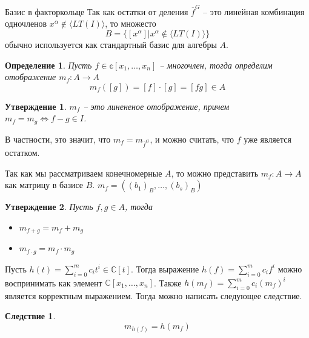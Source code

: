 \documentclass[notheorems,aspectratio=169]{beamer}
\newtheorem{definition}{Определение}
\newtheorem{statement}{Утверждение}
\newtheorem{corollary}{Следствие}
\begin{document}
\begin{frame}{Базис в факторкольце}
    Так как остатки от деления $\overline f^G$ -- это линейная комбинация одночленов $x^\alpha \not\in \langle LT(I) \rangle$, то множесто 
    $$
        B = \{[x^\alpha] | x^\alpha \not\in \langle LT(I) \rangle \}
    $$ 
    обычно используется как стандартный базис для алгебры $A$.
\end{frame}

\begin{frame}{}
    \begin{definition}
        Пусть $f\in\mathbb{c}[x_1,\dots,x_n]$ -- многочлен, тогда определим отображение $m_f:A\rightarrow A$
        $$
        m_f([g]) = [f]\cdot[g] = [fg]\in A
        $$
    \end{definition}
    
    \begin{statement}
        $m_f$ -- это линененое отображение, причем $m_f = m_g \Longleftrightarrow f-g\in I$.
    \end{statement}
        В частности, это значит, что $m_f =m_{\overline f^G}$, и можно считать, что $f$ уже является остатком.
    
    Так как мы рассматриваем конечномерные $A$, то можно представить $m_f:A\rightarrow A$ как матрицу в базисе $B$. $m_f = ((b_1)_B,\dots, (b_s)_B)$
\end{frame}

\begin{frame}
    \begin{statement}
        Пусть $f, g \in A$, тогда
        \begin{itemize}
            \item [(i)] $m_{f+g} = m_f+m_g$
            \item [(ii)] $m_{f\cdot g} = m_f\cdot m_g$
        \end{itemize}
    \end{statement}
    

        Пусть $h(t) = \sum_{i = 0}^m c_it^i \in \mathbb{C}[t]$. Тогда выражение $h(f) = \sum_{i=0}^m c_i f^i$ можно воспринимать как элемент $\mathbb{C}[x_1,\dots, x_n]$. Также $h(m_f) = \sum_{i=0}^m c_i (m_f)^i$ является корректным выражением. Тогда можно написать следующее следствие.
    \begin{corollary}
        $$
            m_{h(f)} = h(m_f)
        $$
    \end{corollary}
\end{frame}
\end{document}
